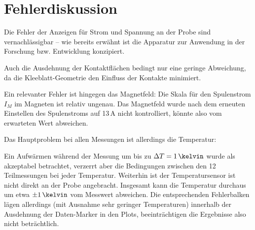 \section{Fehlerdiskussion}
Die Fehler der Anzeigen für Strom und Spannung an der Probe sind vernachlässigbar -- wie bereits erwähnt ist die Apparatur zur Anwendung in der Forschung bzw. Entwicklung konzipiert.

Auch die Ausdehnung der Kontaktflächen bedingt nur eine geringe Abweichung, da die Kleeblatt-Geometrie den Einfluss der Kontakte minimiert.

Ein relevanter Fehler ist hingegen das Magnetfeld: Die Skala für den Spulenstrom $I_M$ im Magneten ist relativ ungenau. Das Magnetfeld wurde nach dem erneuten Einstellen des Spulenstroms auf 13\,A nicht kontrolliert, könnte also vom erwarteten Wert abweichen.

Das Hauptproblem bei allen Messungen ist allerdings die Temperatur:

Ein Aufwärmen während der Messung um bis zu $\Delta T = 1\,\kelvin$ wurde als akzeptabel betrachtet, verzerrt aber die Bedingungen zwischen den 12 Teilmessungen bei jeder Temperatur. Weiterhin ist der Temperatursensor ist nicht direkt an der Probe angebracht. %
Insgesamt kann die Temperatur durchaus um etwa $\pm 1\,\kelvin$ vom Messwert abweichen. Die entsprechenden Fehlerbalken lägen allerdings (mit Ausnahme sehr geringer Temperaturen) innerhalb der Ausdehnung der Daten-Marker in den Plots, beeinträchtigen die Ergebnisse also nicht beträchtlich.
